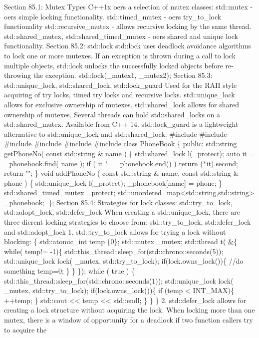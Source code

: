 Section 85.1: Mutex Types C++1x oers a selection of mutex classes:
std::mutex - oers simple locking functionality. std::timed\_mutex - oers
try\_to\_lock functionality std::recursive\_mutex - allows recursive
locking by the same thread. std::shared\_mutex,
std::shared\_timed\_mutex - oers shared and unique lock functionality.
Section 85.2: std::lock std::lock uses deadlock avoidance algorithms to
lock one or more mutexes. If an exception is thrown during a call to
lock multiple objects, std::lock unlocks the successfully locked objects
before re-throwing the exception. std::lock(\_mutex1, \_mutex2); Section
85.3: std::unique\_lock, std::shared\_lock, std::lock\_guard Used for
the RAII style acquiring of try locks, timed try locks and recursive
locks. std::unique\_lock allows for exclusive ownership of mutexes.
std::shared\_lock allows for shared ownership of mutexes. Several
threads can hold std::shared\_locks on a std::shared\_mutex. Available
from C++ 14. std::lock\_guard is a lightweight alternative to
std::unique\_lock and std::shared\_lock. \#include \#include \#include
\#include \#include \#include class PhoneBook \{ public: std::string
getPhoneNo( const std::string \& name ) \{ std::shared\_lock
l(\_protect); auto it = \_phonebook.find( name ); if ( it !=
\_phonebook.end() ) return (*it).second; return ""; \} void addPhoneNo (
const std::string \& name, const std::string \& phone ) \{
std::unique\_lock l(\_protect); \_phonebook{[}name{]} = phone; \}
std::shared\_timed\_mutex \_protect;
std::unordered\_map\textless std::string,std::string\textgreater{}
\_phonebook; \}; Section 85.4: Strategies for lock classes:
std::try\_to\_lock, std::adopt\_lock, std::defer\_lock When creating a
std::unique\_lock, there are three dierent locking strategies to choose
from: std::try\_to\_lock, std::defer\_lock and std::adopt\_lock 1.
std::try\_to\_lock allows for trying a lock without blocking: \{
std::atomic\_int temp \{0\}; std::mutex \_mutex; std::thread t(
\href{}{\&}\{ while( temp!= -1)\{
std::this\_thread::sleep\_for(std::chrono::seconds(5));
std::unique\_lock lock( \_mutex, std::try\_to\_lock);
if(lock.owns\_lock())\{ //do something temp=0; \} \} \}); while ( true )
\{ std::this\_thread::sleep\_for(std::chrono::seconds(1));
std::unique\_lock lock( \_mutex, std::try\_to\_lock);
if(lock.owns\_lock())\{ if (temp \textless{} INT\_MAX)\{ ++temp; \}
std::cout \textless\textless{} temp \textless\textless{} std::endl; \}
\} \} 2. std::defer\_lock allows for creating a lock structure without
acquiring the lock. When locking more than one mutex, there is a window
of opportunity for a deadlock if two function callers try to acquire the
